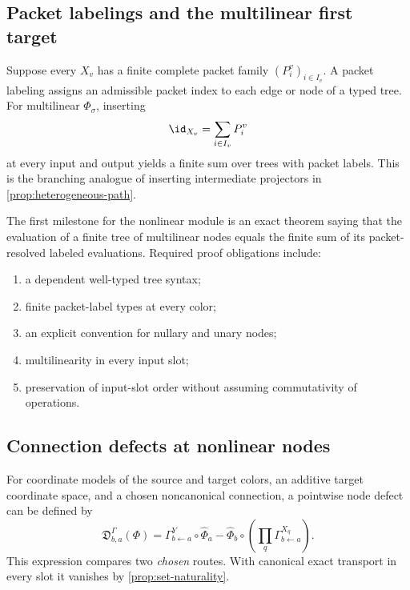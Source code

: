 \subsection{Packet labelings and the multilinear first target}

Suppose every $X_v$ has a finite complete packet family
$(P^v_i)_{i\in I_v}$.  A packet labeling assigns an admissible packet index
to each edge or node of a typed tree.  For multilinear $\Phi_\sigma$, inserting
\[
\id_{X_v}=\sum_{i\in I_v}P^v_i
\]
at every input and output yields a finite sum over trees with packet labels.
This is the branching analogue of inserting intermediate projectors in
\cref{prop:heterogeneous-path}.

\begin{roadmap}
\label{roadmap:multilinear-tree}
The first milestone for the nonlinear module is an exact theorem saying that the
evaluation of a finite tree of multilinear nodes equals the finite sum of its
packet-resolved labeled evaluations.  Required proof obligations include:
\begin{enumerate}[label=(\alph*)]
\item a dependent well-typed tree syntax;
\item finite packet-label types at every color;
\item an explicit convention for nullary and unary nodes;
\item multilinearity in every input slot;
\item preservation of input-slot order without assuming commutativity of
operations.
\end{enumerate}
\end{roadmap}

\subsection{Connection defects at nonlinear nodes}

For coordinate models of the source and target colors, an additive target
coordinate space, and a chosen noncanonical connection, a pointwise node
defect can be defined by
\[
\mathfrak D^\Gamma_{b,a}(\Phi)
=
\Gamma^Y_{b\leftarrow a}\circ\widehat\Phi_a
-
\widehat\Phi_b\circ
\left(\prod_q\Gamma^{X_q}_{b\leftarrow a}\right).
\]
This expression compares two \emph{chosen} routes.  With canonical exact
transport in every slot it vanishes by \cref{prop:set-naturality}.


